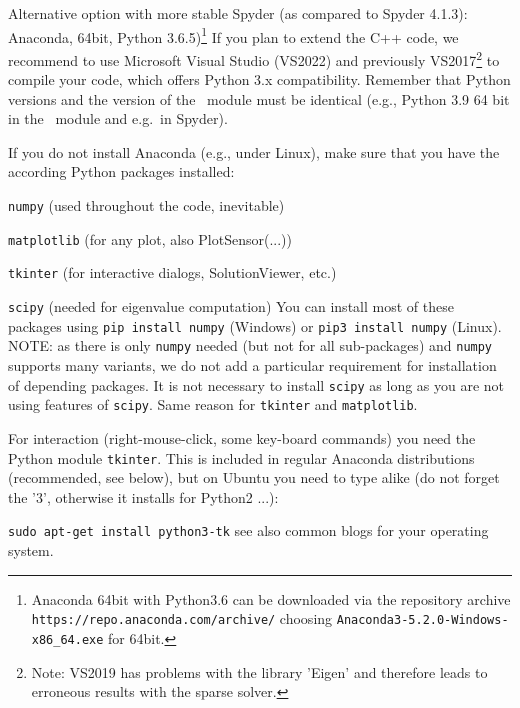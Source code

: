   \item Alternative option with more stable Spyder (as compared to Spyder 4.1.3): Anaconda, 64bit, Python 3.6.5)\footnote{Anaconda 64bit with Python3.6 can be downloaded via the repository archive \texttt{https://repo.anaconda.com/archive/} choosing \texttt{Anaconda3-5.2.0-Windows-x86\_64.exe} for 64bit.}
\ei
If you plan to extend the C++ code, we recommend to use Microsoft Visual Studio (VS2022) and previously VS2017\footnote{Note: VS2019 has problems with the library 'Eigen' and therefore leads to erroneous results with the sparse solver.} to compile your code, which offers Python 3.x compatibility.
Remember that Python versions and the version of the \codeName\ module must be identical (e.g., Python 3.9 64 bit  in the \codeName\ module and e.g.\ in Spyder).

If you do not install Anaconda (e.g., under Linux), make sure that you have the according Python packages installed:
\bi
  \item \texttt{numpy} (used throughout the code, inevitable)
  \item \texttt{matplotlib} (for any plot, also PlotSensor(...))
  \item \texttt{tkinter} (for interactive dialogs, SolutionViewer, etc.)
  \item \texttt{scipy} (needed for eigenvalue computation)
\ei
You can install most of these packages using \texttt{pip install numpy} (Windows) or \texttt{pip3 install numpy} (Linux).
NOTE: as there is only \texttt{numpy} needed (but not for all sub-packages) and \texttt{numpy} supports many variants, we do not add a particular requirement for installation of depending packages. It is not necessary to install \texttt{scipy} as long as you are not using features of \texttt{scipy}. Same reason for \texttt{tkinter} and \texttt{matplotlib}.

For interaction (right-mouse-click, some key-board commands) you need the Python module \texttt{tkinter}. This is included in regular Anaconda distributions (recommended, see below), but on Ubuntu you need to type alike (do not forget the '3', otherwise it installs for Python2 ...):
\bi
  \item[] \texttt{sudo apt-get install python3-tk}
\ei
see also common blogs for your operating system.

